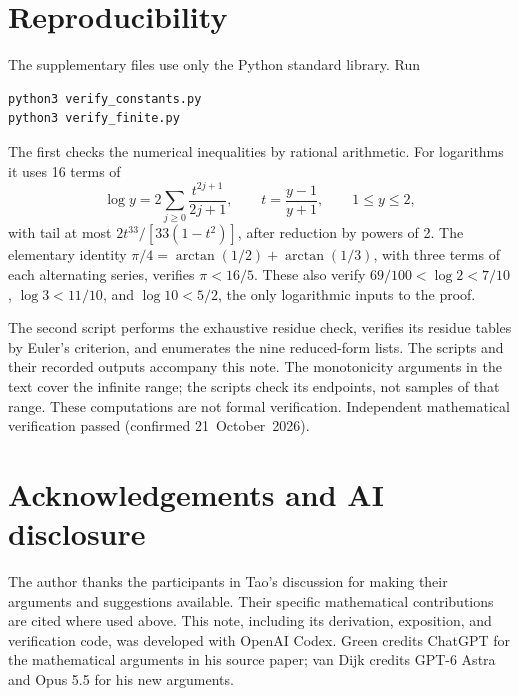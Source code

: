 \documentclass[11pt]{article}
\begin{document}
\section*{Reproducibility}

The supplementary files use only the Python standard library. Run
\begin{verbatim}
python3 verify_constants.py
python3 verify_finite.py
\end{verbatim}
The first checks the numerical inequalities by rational arithmetic.
For logarithms it uses 16 terms of
\[
 \log y=2\sum_{j\ge0}\frac{t^{2j+1}}{2j+1},\qquad
 t=\frac{y-1}{y+1},\qquad 1\le y\le2,
\]
with tail at most \(2t^{33}/[33(1-t^2)]\), after reduction by powers
of 2. The elementary identity
\(\pi/4=\arctan(1/2)+\arctan(1/3)\), with three terms of each
alternating series, verifies \(\pi<16/5\). These also verify
\(69/100<\log2<7/10\), \(\log3<11/10\), and \(\log10<5/2\),
the only logarithmic inputs to the proof.

The second script performs the exhaustive residue check, verifies
its residue tables by Euler's criterion, and enumerates the nine
reduced-form lists. The scripts and their recorded outputs accompany
this note. The monotonicity arguments in the text cover the infinite
range; the scripts check its endpoints, not samples of that range.
These computations are not formal verification. Independent mathematical
verification passed (confirmed 21~October~2026).

\section*{Acknowledgements and AI disclosure}

The author thanks the participants in Tao's discussion for making
their arguments and suggestions available. Their specific mathematical
contributions are cited where used above. This note, including its
derivation, exposition, and verification code, was developed with
OpenAI Codex. Green \cite{green} credits ChatGPT for the mathematical
arguments in his source paper; van Dijk \cite{vandijk} credits
GPT-6 Astra and Opus 5.5 for his new arguments.
\end{document}
